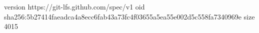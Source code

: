version https://git-lfs.github.com/spec/v1
oid sha256:5b27414faeadca4a8ecc6fab43a73fc4f03655a5ea55e002d5c558fa7340969e
size 4015
